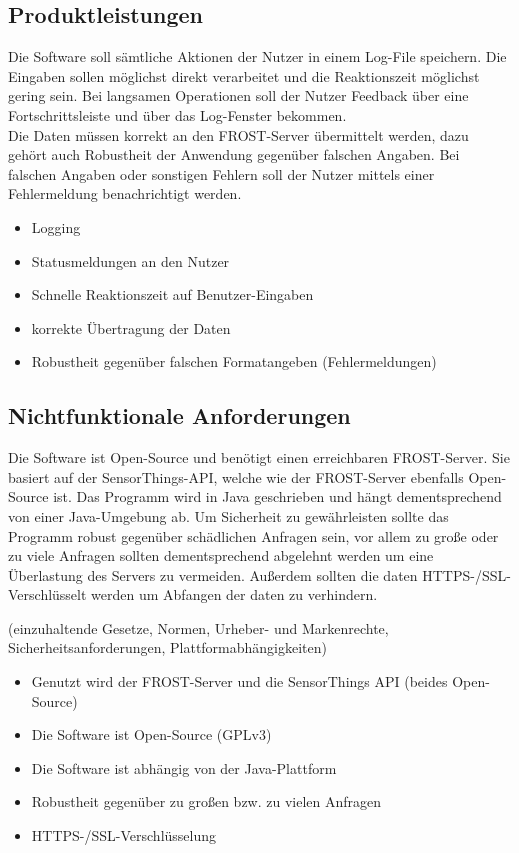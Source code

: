 \documentclass[12 pt]{article}
\begin{document}
	\subsection{Produktleistungen}
	Die Software soll sämtliche Aktionen der Nutzer in einem Log-File speichern. Die Eingaben sollen möglichst direkt verarbeitet und die Reaktionszeit möglichst gering sein. Bei langsamen Operationen soll der Nutzer Feedback über eine Fortschrittsleiste und über das Log-Fenster bekommen. \\
	Die Daten müssen korrekt an den FROST-Server übermittelt werden, dazu gehört auch Robustheit der Anwendung gegenüber falschen Angaben. Bei falschen Angaben oder sonstigen Fehlern soll der Nutzer mittels einer Fehlermeldung benachrichtigt werden.
	\begin{itemize}
		\item Logging
		\item Statusmeldungen an den Nutzer
		\item Schnelle Reaktionszeit auf Benutzer-Eingaben
		\item korrekte Übertragung der Daten
		\item Robustheit gegenüber falschen Formatangeben (Fehlermeldungen)
	\end{itemize}
	
	\subsection{Nichtfunktionale Anforderungen}
	Die Software ist Open-Source und benötigt einen erreichbaren FROST-Server. Sie basiert auf der SensorThings-API, welche wie der FROST-Server ebenfalls Open-Source ist.
	Das Programm wird in Java geschrieben und hängt dementsprechend von einer Java-Umgebung ab.
	Um Sicherheit zu gewährleisten sollte das Programm robust gegenüber schädlichen Anfragen sein, vor allem zu große oder zu viele Anfragen sollten dementsprechend abgelehnt werden um eine Überlastung des Servers zu vermeiden.
	Außerdem sollten die daten HTTPS-/SSL-Verschlüsselt werden um Abfangen der daten zu verhindern.
	
	(einzuhaltende Gesetze, Normen, Urheber- und Markenrechte,
	Sicherheitsanforderungen, Plattformabhängigkeiten)
	\begin{itemize}
		\item Genutzt wird der FROST-Server und die SensorThings API (beides Open-Source)
		\item Die Software ist Open-Source (GPLv3)
		\item Die Software ist abhängig von der Java-Plattform
		\item Robustheit gegenüber zu großen bzw. zu vielen Anfragen 		
		\item HTTPS-/SSL-Verschlüsselung								
	\end{itemize}
	
\end{document}
